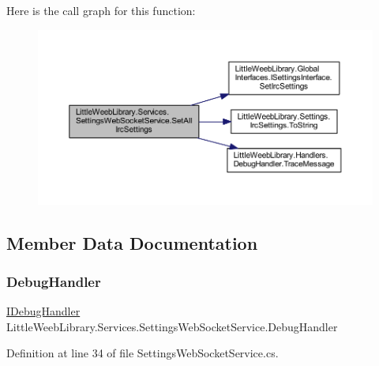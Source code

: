 Here is the call graph for this function\+:\nopagebreak
\begin{figure}[H]
\begin{center}
\leavevmode
\includegraphics[width=350pt]{class_little_weeb_library_1_1_services_1_1_settings_web_socket_service_a6eba1d3b176e627d3dae57070e1c3beb_cgraph}
\end{center}
\end{figure}


\subsection{Member Data Documentation}
\mbox{\label{class_little_weeb_library_1_1_services_1_1_settings_web_socket_service_ab5a47129a4d077a3497d67c1b39e4b6d}} 
\subsubsection{\texorpdfstring{Debug\+Handler}{DebugHandler}}
{\footnotesize\ttfamily \mbox{\hyperlink{interface_little_weeb_library_1_1_handlers_1_1_i_debug_handler}{I\+Debug\+Handler}} Little\+Weeb\+Library.\+Services.\+Settings\+Web\+Socket\+Service.\+Debug\+Handler\hspace{0.3cm}{\ttfamily [private]}}



Definition at line 34 of file Settings\+Web\+Socket\+Service.\+cs.

